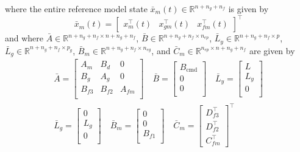 \documentclass[journal]{IEEEtran}
\theoremstyle{innercustomthm}
\begin{document}
  where the entire reference model state $\bar{x}_{m}(t)\in\mathbb{R}^{n+n_{g}+n_{f}}$ is given by
  \begin{equation*}
    \bar{x}_{m}(t) =
    \begin{bmatrix}
      x_{m}^{\top}(t) & x_{gm}^{\top}(t) & x_{fm}^{\top}(t)
    \end{bmatrix}^{\top}
  \end{equation*}
  and where $\bar{A}\in\mathbb{R}^{n+n_{g}+n_{f}\times n+n_{g}+n_{f}}$, $\bar{B}\in\mathbb{R}^{n+n_{g}+n_{f}\times n_{ep}}$, $\bar{L}_{y}\in\mathbb{R}^{n+n_{g}+n_{f}\times p}$, $\bar{L}_{g}\in\mathbb{R}^{n+n_{g}+n_{f}\times p_{g}}$, $\bar{B}_{m}\in\mathbb{R}^{n+n_{g}+n_{f}\times n_{eg}}$, and $\bar{C}_{m}\in\mathbb{R}^{n_{ep} \times n+n_{g}+n_{f}}$ are given by
  \begin{equation*}
    \begin{gathered}
      \bar{A} =
      \begin{bmatrix}
        A_{m} & B_{d} & 0 \\
        B_{g} & A_{g} & 0 \\
        B_{f3} & B_{f2} & A_{fm} \\
      \end{bmatrix}
      \quad
      \bar{B} =
      \begin{bmatrix}
        B_{\text{cmd}} \\
        0 \\
        0 \\
      \end{bmatrix}
      \quad
      \bar{L}_{y} =
      \begin{bmatrix}
        L \\
        L_{y} \\
        0 \\
      \end{bmatrix} \\
      \bar{L}_{g} =
      \begin{bmatrix}
        0 \\
        L_{g} \\
        0 \\
      \end{bmatrix}
      \quad
      \bar{B}_{m} =
      \begin{bmatrix}
        0 \\
        0 \\
        B_{f1} \\
      \end{bmatrix}
      \quad
      \bar{C}_{m} =
      \begin{bmatrix}
        D_{f3}^{\top} \\
        D_{f2}^{\top} \\
        C_{fm}^{\top}
      \end{bmatrix}^{\top}
    \end{gathered}
  \end{equation*}
\end{document}
